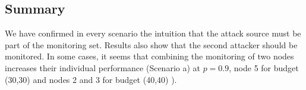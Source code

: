 \subsection{Summary}
We have confirmed in every scenario the intuition that the attack source must be part of the monitoring set. Results also show that the second attacker should be monitored.
In some cases, it seems that combining the monitoring of two nodes increases their individual performance (\eg Scenario a) at $p=0.9$, node 5 for budget (30,30) and nodes 2 and 3 for budget (40,40) ).



